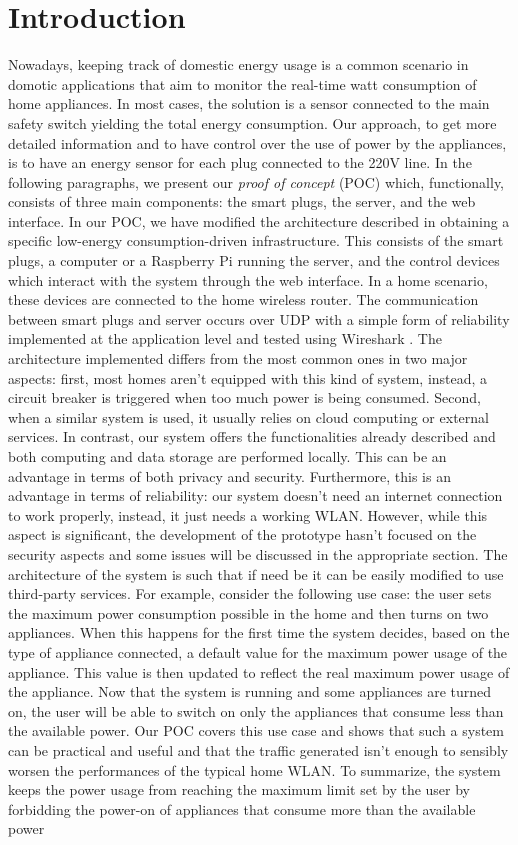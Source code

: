 \documentclass[conference]{IEEEtran}
\begin{document}
	\section{Introduction}
	Nowadays, keeping track of domestic energy usage is a common scenario in domotic applications that aim to monitor the real-time watt consumption of home appliances. In most cases, the solution is a sensor connected to the main safety switch yielding the total energy consumption. Our approach, to get more detailed information and to have control over the use of power by the appliances, is to have an energy sensor for each plug connected to the 220V line. In the following paragraphs, we present our \textit{proof of concept} (POC) which, functionally, consists of three main components: the smart plugs, the server, and the web interface. In our POC, we have modified the architecture described in \cite{8110428} obtaining a specific low-energy consumption-driven infrastructure. This consists of the smart plugs, a computer or a Raspberry Pi running the server, and the control devices which interact with the system through the web interface. In a home scenario, these devices are connected to the home wireless router. The communication between smart plugs and server occurs over UDP with a simple form of reliability implemented at the application level and tested using Wireshark \cite{wireshark}. The architecture implemented differs from the most common ones in two major aspects: first, most homes aren't equipped with this kind of system, instead, a circuit breaker is triggered when too much power is being consumed. Second, when a similar system is used, it usually relies on cloud computing or external services. In contrast, our system offers the functionalities already described and both computing and data storage are performed locally. This can be an advantage in terms of both privacy and security. Furthermore, this is an advantage in terms of reliability: our system doesn't need an internet connection to work properly, instead, it just needs a working WLAN. However, while this aspect is significant, the development of the prototype hasn't focused on the security aspects and some issues will be discussed in the appropriate section. The architecture of the system is such that if need be it can be easily modified to use third-party services. For example, consider the following use case: the user sets the maximum power consumption possible in the home and then turns on two appliances. When this happens for the first time the system decides, based on the type of appliance connected, a default value for the maximum power usage of the appliance. This value is then updated to reflect the real maximum power usage of the appliance. Now that the system is running and some appliances are turned on, the user will be able to switch on only the appliances that consume less than the available power. Our POC covers this use case and shows that such a system can be practical and useful and that the traffic generated isn't enough to sensibly worsen the performances of the typical home WLAN. To summarize, the system keeps the power usage from reaching the maximum limit set by the user by forbidding the power-on of appliances that consume more than the available power 
\end{document}
